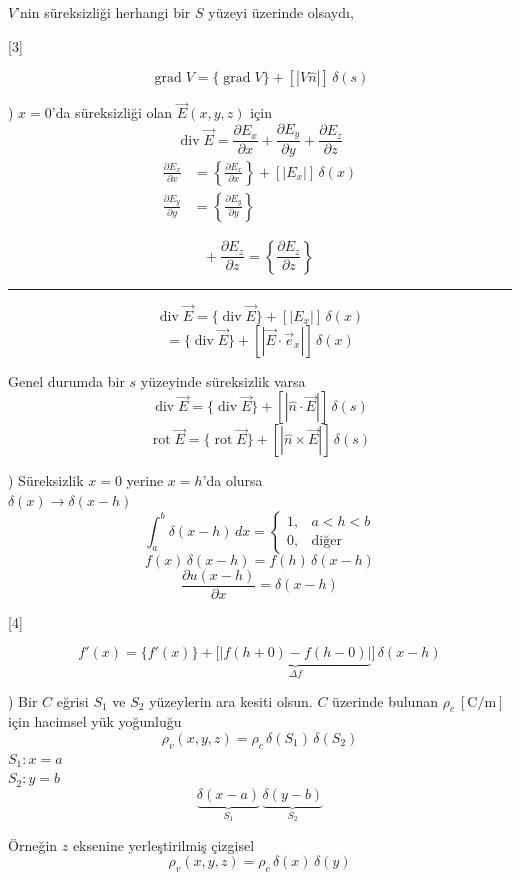 \documentclass[11pt,a4paper]{article}
\begin{document}
\noindent $V$'nin süreksizliği herhangi bir $S$ yüzeyi üzerinde olsaydı,

[3]

\[
\operatorname{grad}V=\{\operatorname{grad}V\}+[|V\hat n|]\,\delta(s)
\]

) $x=0$'da süreksizliği olan $\vec E(x,y,z)$ için
\[
\operatorname{div}\vec E=\frac{\partial E_x}{\partial x}+\frac{\partial E_y}{\partial y}+\frac{\partial E_z}{\partial z}
\]
\begin{align*}
\frac{\partial E_x}{\partial x}&=\left\{\frac{\partial E_x}{\partial x}\right\}+[|E_x|]\,\delta(x)\\
\frac{\partial E_y}{\partial y}&=\left\{\frac{\partial E_y}{\partial y}\right\}
\end{align*}

\[
+\ \frac{\partial E_z}{\partial z}=\left\{\frac{\partial E_z}{\partial z}\right\}
\]
\noindent\rule{0.85\linewidth}{0.4pt}
\[
\operatorname{div}\vec E=\{\operatorname{div}\vec E\}+[|E_x|]\,\delta(x)
\]
\[
=\{\operatorname{div}\vec E\}+[|\vec E\cdot\vec e_x|]\,\delta(x)
\]

\noindent Genel durumda bir $s$ yüzeyinde süreksizlik varsa
\[
\operatorname{div}\vec E=\{\operatorname{div}\vec E\}+[|\hat n\cdot\vec E|]\,\delta(s)
\]
\[
\operatorname{rot}\vec E=\{\operatorname{rot}\vec E\}+[|\hat n\times\vec E|]\,\delta(s)
\]

) Süreksizlik $x=0$ yerine $x=h$'da olursa\\
$\delta(x)\to\delta(x-h)$
\[
\int_a^b\delta(x-h)\,dx=\begin{cases}1, & a<h<b\\ 0, & \text{diğer}\end{cases}
\]
\[
f(x)\,\delta(x-h)=f(h)\,\delta(x-h)
\]
\[
\frac{\partial u(x-h)}{\partial x}=\delta(x-h)
\]

[4]

\[
f'(x)=\{f'(x)\}+\Big[\underbrace{|f(h+0)-f(h-0)|}_{\Delta f}\Big]\,\delta(x-h)
\]

) Bir $C$ eğrisi $S_1$ ve $S_2$ yüzeylerin ara kesiti olsun. $C$ üzerinde bulunan $\rho_c\ [\mathrm{C/m}]$ için hacimsel yük yoğunluğu
\[
\rho_v(x,y,z)=\rho_c\,\delta(S_1)\,\delta(S_2)
\]
\noindent $S_1: x=a$\\
$S_2: y=b$
\[
\underbrace{\delta(x-a)}_{S_1}\,\underbrace{\delta(y-b)}_{S_2}
\]

\noindent Örneğin $z$ eksenine yerleştirilmiş çizgisel
\[
\rho_v(x,y,z)=\rho_c\,\delta(x)\,\delta(y)
\]
\end{document}
